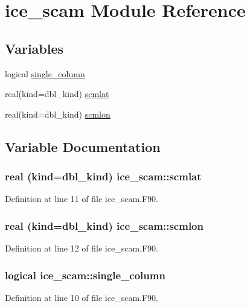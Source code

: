 \hypertarget{namespaceice__scam}{
\section{ice\_\-scam Module Reference}
\label{namespaceice__scam}
}
\subsection*{Variables}
\begin{DoxyCompactItemize}
\item 
logical \hyperlink{namespaceice__scam_a34d0d2e7da10c0e3b977aa989b318dac}{single\_\-column}
\item 
real(kind=dbl\_\-kind) \hyperlink{namespaceice__scam_a72933cc98dddc52d1f629eb311a715af}{scmlat}
\item 
real(kind=dbl\_\-kind) \hyperlink{namespaceice__scam_a3064f1ae884e72d621f753a3a3363b17}{scmlon}
\end{DoxyCompactItemize}


\subsection{Variable Documentation}
\hypertarget{namespaceice__scam_a72933cc98dddc52d1f629eb311a715af}{
\subsubsection[{scmlat}]{\setlength{\rightskip}{0pt plus 5cm}real (kind=dbl\_\-kind) {\bf ice\_\-scam::scmlat}}}
\label{namespaceice__scam_a72933cc98dddc52d1f629eb311a715af}


Definition at line 11 of file ice\_\-scam.F90.\hypertarget{namespaceice__scam_a3064f1ae884e72d621f753a3a3363b17}{
\subsubsection[{scmlon}]{\setlength{\rightskip}{0pt plus 5cm}real (kind=dbl\_\-kind) {\bf ice\_\-scam::scmlon}}}
\label{namespaceice__scam_a3064f1ae884e72d621f753a3a3363b17}


Definition at line 12 of file ice\_\-scam.F90.\hypertarget{namespaceice__scam_a34d0d2e7da10c0e3b977aa989b318dac}{
\subsubsection[{single\_\-column}]{\setlength{\rightskip}{0pt plus 5cm}logical {\bf ice\_\-scam::single\_\-column}}}
\label{namespaceice__scam_a34d0d2e7da10c0e3b977aa989b318dac}


Definition at line 10 of file ice\_\-scam.F90.